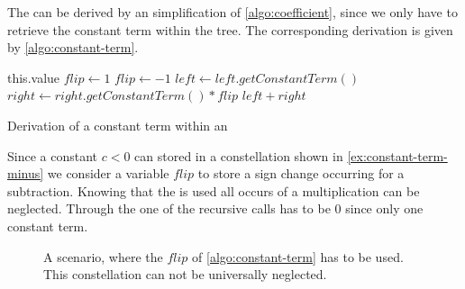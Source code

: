 The \updateconstants can be derived by an simplification of \autoref{algo:coefficient}, since we only have to retrieve the constant term within the tree. The corresponding derivation is given by \autoref{algo:constant-term}.

\begin{algorithm}[H]
	\begin{algorithmic}[1]
				\State \Return this.value
			\EndIf
			\State
			\State $flip \gets 1$
				\State $flip \gets -1$
			\EndIf
				\State $left \gets left.getConstantTerm()$ 
				\State $right \gets right.getConstantTerm()*flip$
				\State \Return $left+right$
			\EndIf
		\EndFunction
	\end{algorithmic}
	\caption{Derivation of a constant term within an \rpntree}
	\label{algo:constant-term}
\end{algorithm}
Since a constant $c < 0$ can stored in a constellation shown in \autoref{ex:constant-term-minus} we consider a variable $flip$ to store a sign change occurring for a subtraction. Knowing that the \stdLinInt is used all occurs of a multiplication can be neglected.\newline %
Through the \stdLinInt one of the recursive calls has to be $0$ since only one constant term.

\begin{figure}[H]
	\centering
	\caption{A scenario, where the $flip$ of \autoref{algo:constant-term} has to be used. This constellation can not be universally neglected.}
	\label{ex:constant-term-minus}
\end{figure}

